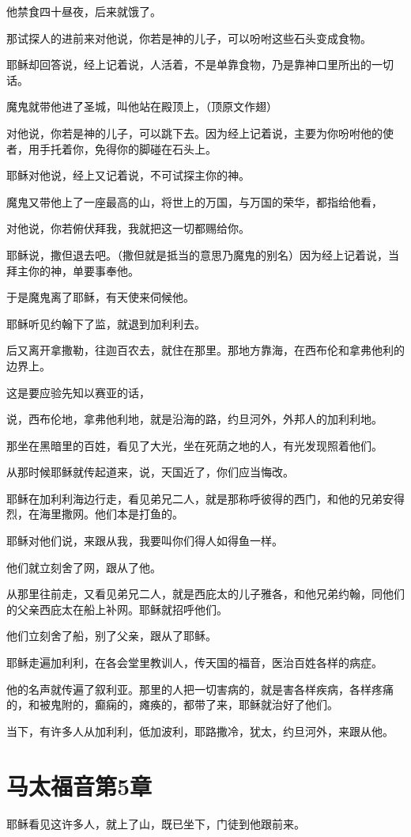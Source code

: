 \documentclass[12pt,oneside]{book}
\begin{document}
他禁食四十昼夜，后来就饿了。

那试探人的进前来对他说，你若是神的儿子，可以吩咐这些石头变成食物。

耶稣却回答说，经上记着说，人活着，不是单靠食物，乃是靠神口里所出的一切话。

魔鬼就带他进了圣城，叫他站在殿顶上，（顶原文作翅）

对他说，你若是神的儿子，可以跳下去。因为经上记着说，主要为你吩咐他的使者，用手托着你，免得你的脚碰在石头上。

耶稣对他说，经上又记着说，不可试探主你的神。

魔鬼又带他上了一座最高的山，将世上的万国，与万国的荣华，都指给他看，

对他说，你若俯伏拜我，我就把这一切都赐给你。

耶稣说，撒但退去吧。（撒但就是抵当的意思乃魔鬼的别名）因为经上记着说，当拜主你的神，单要事奉他。

于是魔鬼离了耶稣，有天使来伺候他。

耶稣听见约翰下了监，就退到加利利去。

后又离开拿撒勒，往迦百农去，就住在那里。那地方靠海，在西布伦和拿弗他利的边界上。

这是要应验先知以赛亚的话，

说，西布伦地，拿弗他利地，就是沿海的路，约旦河外，外邦人的加利利地。

那坐在黑暗里的百姓，看见了大光，坐在死荫之地的人，有光发现照着他们。

从那时候耶稣就传起道来，说，天国近了，你们应当悔改。

耶稣在加利利海边行走，看见弟兄二人，就是那称呼彼得的西门，和他的兄弟安得烈，在海里撒网。他们本是打鱼的。

耶稣对他们说，来跟从我，我要叫你们得人如得鱼一样。

他们就立刻舍了网，跟从了他。

从那里往前走，又看见弟兄二人，就是西庇太的儿子雅各，和他兄弟约翰，同他们的父亲西庇太在船上补网。耶稣就招呼他们。

他们立刻舍了船，别了父亲，跟从了耶稣。

耶稣走遍加利利，在各会堂里教训人，传天国的福音，医治百姓各样的病症。

他的名声就传遍了叙利亚。那里的人把一切害病的，就是害各样疾病，各样疼痛的，和被鬼附的，癫痫的，瘫痪的，都带了来，耶稣就治好了他们。

当下，有许多人从加利利，低加波利，耶路撒冷，犹太，约旦河外，来跟从他。

\chapter{马太福音第5章}
耶稣看见这许多人，就上了山，既已坐下，门徒到他跟前来。
\end{document}
